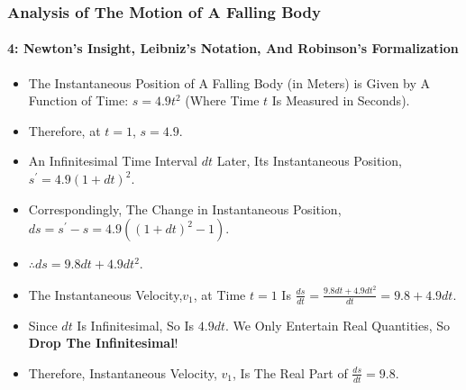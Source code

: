 \begin{frame}
\frametitle{Analysis of The Motion of \alert{A Falling Body}}
\framesubtitle{4: Newton's Insight, Leibniz's Notation, And Robinson's Formalization}
\label{slide:analysis-of-falling-body-4}
\begin{itemize}
\pause
\item The Instantaneous Position of A Falling Body (in Meters) is Given by A Function of Time: $s=4.9t^2$ (Where Time $t$ Is Measured in Seconds).
\pause
\item Therefore, at $t=1$, $s=4.9$.
\pause
\item An Infinitesimal Time Interval $dt$ Later, Its Instantaneous Position, $s^\prime=4.9(1+dt)^2$.
\pause
\item Correspondingly, The Change in Instantaneous Position, $ds=s^\prime-s=4.9((1+dt)^2-1)$.
\pause
\item $\therefore ds=9.8dt+4.9dt^2$.
\pause
\item The Instantaneous Velocity,$v_1$, at Time $t=1$ Is $\frac{ds}{dt}=\frac{9.8dt+4.9dt^2}{dt}=9.8+4.9dt$.
\pause
\item Since \alert{$dt$ Is Infinitesimal, So Is $4.9dt$}. We Only Entertain Real Quantities, So \textbf{Drop The Infinitesimal}!
\pause
\item Therefore, Instantaneous Velocity, $v_1$, \alert{Is The Real Part of $\frac{ds}{dt}=9.8$}.
\end{itemize}
\end{frame}
